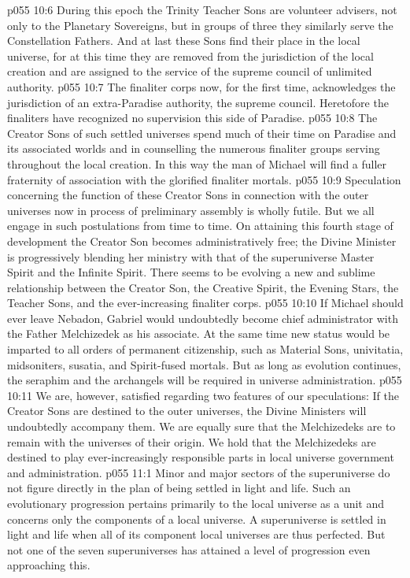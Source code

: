 \vs p055 10:6 During this epoch the Trinity Teacher Sons are volunteer advisers, not only to the Planetary Sovereigns, but in groups of three they similarly serve the Constellation Fathers. And at last these Sons find their place in the local universe, for at this time they are removed from the jurisdiction of the local creation and are assigned to the service of the supreme council of unlimited authority.
\vs p055 10:7 \pc The finaliter corps now, for the first time, acknowledges the jurisdiction of an extra\hyp{}Paradise authority, the supreme council. Heretofore the finaliters have recognized no supervision this side of Paradise.
\vs p055 10:8 The Creator Sons of such settled universes spend much of their time on Paradise and its associated worlds and in counselling the numerous finaliter groups serving throughout the local creation. In this way the man of Michael will find a fuller fraternity of association with the glorified finaliter mortals.
\vs p055 10:9 \pc Speculation concerning the function of these Creator Sons in connection with the outer universes now in process of preliminary assembly is wholly futile. But we all engage in such postulations from time to time. On attaining this fourth stage of development the Creator Son becomes administratively free; the Divine Minister is progressively blending her ministry with that of the superuniverse Master Spirit and the Infinite Spirit. There seems to be evolving a new and sublime relationship between the Creator Son, the Creative Spirit, the Evening Stars, the Teacher Sons, and the ever\hyp{}increasing finaliter corps.
\vs p055 10:10 If Michael should ever leave Nebadon, Gabriel would undoubtedly become chief administrator with the Father Melchizedek as his associate. At the same time new status would be imparted to all orders of permanent citizenship, such as Material Sons, univitatia, midsoniters, susatia, and Spirit\hyp{}fused mortals. But as long as evolution continues, the seraphim and the archangels will be required in universe administration.
\vs p055 10:11 We are, however, satisfied regarding two features of our speculations: If the Creator Sons are destined to the outer universes, the Divine Ministers will undoubtedly accompany them. We are equally sure that the Melchizedeks are to remain with the universes of their origin. We hold that the Melchizedeks are destined to play ever\hyp{}increasingly responsible parts in local universe government and administration.
\vs p055 11:1 Minor and major sectors of the superuniverse do not figure directly in the plan of being settled in light and life. Such an evolutionary progression pertains primarily to the local universe as a unit and concerns only the components of a local universe. A superuniverse is settled in light and life when all of its component local universes are thus perfected. But not one of the seven superuniverses has attained a level of progression even approaching this.

